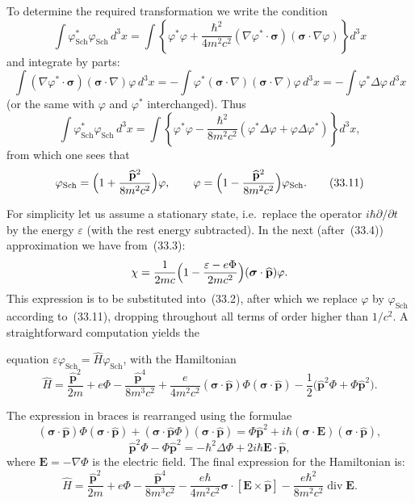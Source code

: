 To determine the required transformation we write the condition
\[
\int\varphi^*_{\text{Sch}}\varphi_{\text{Sch}}\,d^3x = \int\left\{\varphi^*\varphi + \frac{\hbar^2}{4m^2c^2}(\nabla\varphi^*\cdot\boldsymbol{\sigma})(\boldsymbol{\sigma}\cdot\nabla\varphi)\right\}d^3x
\]
and integrate by parts:
\[
\int(\nabla\varphi^*\cdot\boldsymbol{\sigma})(\boldsymbol{\sigma}\cdot\nabla)\varphi\,d^3x = -\int\varphi^*(\boldsymbol{\sigma}\cdot\nabla)(\boldsymbol{\sigma}\cdot\nabla)\varphi\,d^3x = -\int\varphi^*\Delta\varphi\,d^3x
\]
(or the same with $\varphi$ and $\varphi^*$ interchanged). Thus
\[
\int\varphi^*_{\text{Sch}}\varphi_{\text{Sch}}\,d^3x = \int\left\{\varphi^*\varphi - \frac{\hbar^2}{8m^2c^2}(\varphi^*\Delta\varphi + \varphi\Delta\varphi^*)\right\}d^3x,
\]
from which one sees that
\begin{equation}
\varphi_{\text{Sch}} = \Bigl(1 + \frac{\widehat{\mathbf{p}}^2}{8m^2c^2}\Bigr)\varphi,\qquad \varphi = \Bigl(1 - \frac{\widehat{\mathbf{p}}^2}{8m^2c^2}\Bigr)\varphi_{\text{Sch}}.
\tag{33.11}
\end{equation}

For simplicity let us assume a stationary state, i.e.\ replace the operator $i\hbar\partial/\partial t$ by the energy $\varepsilon$ (with the rest energy subtracted). In the next (after~(33.4)) approximation we have from~(33.3):
\[
\chi = \frac{1}{2mc}\Bigl(1 - \frac{\varepsilon - e\Phi}{2mc^2}\Bigr)(\boldsymbol{\sigma}\cdot\widehat{\mathbf{p}})\varphi.
\]
This expression is to be substituted into~(33.2), after which we replace $\varphi$ by $\varphi_{\text{Sch}}$ according to~(33.11), dropping throughout all terms of order higher than $1/c^2$. A straightforward computation yields the

equation $\varepsilon\varphi_{\text{Sch}} = \widehat H\varphi_{\text{Sch}}$, with the Hamiltonian
\begin{equation}
\widehat H = \frac{\widehat{\mathbf{p}}^2}{2m} + e\Phi - \frac{\widehat{\mathbf{p}}^4}{8m^3c^2} + \frac{e}{4m^2c^2}(\boldsymbol{\sigma}\cdot\widehat{\mathbf{p}})\Phi(\boldsymbol{\sigma}\cdot\widehat{\mathbf{p}}) - \frac{1}{2}\bigl(\widehat{\mathbf{p}}^2\Phi + \Phi\widehat{\mathbf{p}}^2\bigr).
\tag{33.12}
\end{equation}

The expression in braces is rearranged using the formulae
\[
(\boldsymbol{\sigma}\cdot\widehat{\mathbf{p}})\Phi(\boldsymbol{\sigma}\cdot\widehat{\mathbf{p}}) + (\boldsymbol{\sigma}\cdot\widehat{\mathbf{p}}\Phi)(\boldsymbol{\sigma}\cdot\widehat{\mathbf{p}}) = \Phi\widehat{\mathbf{p}}^2 + i\hbar(\boldsymbol{\sigma}\cdot\mathbf{E})(\boldsymbol{\sigma}\cdot\widehat{\mathbf{p}}),
\]
\[
\widehat{\mathbf{p}}^2\Phi - \Phi\widehat{\mathbf{p}}^2 = -\hbar^2\Delta\Phi + 2i\hbar\mathbf{E}\cdot\widehat{\mathbf{p}},
\]
where $\mathbf{E} = -\nabla\Phi$ is the electric field. The final expression for the Hamiltonian is:
\begin{equation}
\widehat H = \frac{\widehat{\mathbf{p}}^2}{2m} + e\Phi - \frac{\widehat{\mathbf{p}}^4}{8m^3c^2} - \frac{e\hbar}{4m^2c^2}\boldsymbol{\sigma}\cdot[\mathbf{E}\times\widehat{\mathbf{p}}] - \frac{e\hbar^2}{8m^2c^2}\operatorname{div}\mathbf{E}.
\tag{33.12}
\end{equation}

